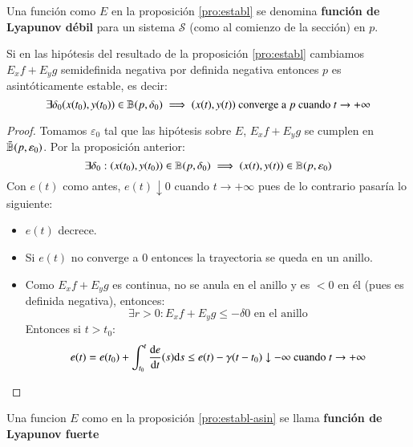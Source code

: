 \begin{dfn}
    Una función como $E$ en la proposición \ref{pro:establ} se denomina \textbf{función de Lyapunov débil} para un sistema $\mathcal{S}$ (como al comienzo de la sección) en $p$.
\end{dfn}
\begin{pro}\label{pro:establ-asin}
    Si en las hipótesis del resultado de la proposición \ref{pro:establ} cambiamos $E_x f + E_y g$ semidefinida negativa por definida negativa entonces $p$ es asintóticamente estable, es decir:
    $$
        \exists \delta_0  (x(t_0), y(t_0)) \in \mathbb{B}(p, \delta_0) \implies (x(t), y(t)) \text{ converge a $p$ cuando } t \to +\infty
    $$
\end{pro}
\begin{proof}
    Tomamos $\varepsilon_0$ tal que las hipótesis sobre $E$, $E_x f + E_y g$ se cumplen en $\bar{\mathbb{B}}(p, \varepsilon_0)$. Por la proposición anterior:
    $$
        \exists \delta_0 : (x(t_0), y(t_0)) \in \mathbb{B}(p, \delta_0) \implies (x(t), y(t)) \in \mathbb{B}(p, \varepsilon_0)
    $$
    Con $e(t)$ como antes, $e(t) \downarrow 0$ cuando $t \to +\infty$ pues de lo contrario pasaría lo siguiente:
    \begin{itemize}
        \item $e(t)$ decrece.
        \item Si $e(t)$ no converge a $0$ entonces la trayectoria se queda en un anillo.
        \item Como $E_x f + E_y g$ es continua, no se anula en el anillo y es $< 0$ en él (pues es definida negativa), entonces:
        $$
            \exists r>0 : E_x f + E_y g \leq - \delta  0 \text{ en el anillo}
        $$
        Entonces si $t > t_0$:
        $$
            e(t) = e(t_0) + \int_{t_0}^{t} \frac{\mathrm{d}e}{\mathrm{d}t}(s) \mathrm{d} s \leq e(t) - \gamma(t-t_0) \downarrow -\infty \text{ cuando } t\to +\infty
        $$
    \end{itemize}
\end{proof}
\begin{dfn}
    Una funcion $E$ como en la proposición \ref{pro:establ-asin} se llama \textbf{función de Lyapunov fuerte}
\end{dfn}
